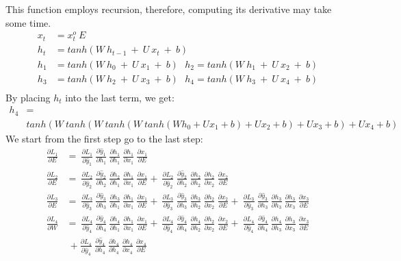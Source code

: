 \documentclass{article}
\begin{document}
This function employs recursion, therefore, computing its derivative may take some time.
\begin{align*}
        x_t &= x^o_t ~ E\\
	h_t &= tanh(W ~h_{t-1}~+~U~x_t ~+~b)\\
	h_1 & = tanh(W ~h_{0}~+~U~x_1 ~+~b) ~~~ h_2 = tanh(W ~h_{1}~+~U~x_2 ~+~b)\\
	h_3 &= tanh(W ~h_{2}~+~U~x_3 ~+~b)~~~h_4 = tanh(W ~h_{3}~+~U~x_4 ~+~b)\\
\end{align*}
By placing $h_t$ into the last term, we get:
\begin{align*}
	h_4 &= \\
	& tanh(W ~tanh(W ~tanh(W ~tanh(W h_{0}+Ux_1 +b)+Ux_2 +b)+Ux_3 +b) +Ux_4 +b)
\end{align*}
We start from the first step go to the last step:
\begin{align*}
\frac{\partial L_1}{ \partial{E}} & = ~\frac{\partial L_1}{ \partial \hat{y}_1}~\frac{\partial \hat{y}_1}{ \partial h_1}
 ~\frac{\partial h_1}{ \partial h_1} ~\frac{\partial h_1}{ \partial x_1} ~\frac{\partial x_1}{ \partial E}\\
	\frac{\partial L_2}{ \partial{E}} & = ~\frac{\partial L_2}{ \partial \hat{y}_2}~\frac{\partial \hat{y}_2}{ \partial h_2}
 ~\frac{\partial h_2}{ \partial h_1} ~\frac{\partial h_1}{ \partial x_1} ~\frac{\partial x_1}{ \partial E}	+ ~\frac{\partial L_2}{ \partial \hat{y}_2}~\frac{\partial \hat{y}_2}{ \partial h_2}
 ~\frac{\partial h_2}{ \partial h_2} ~\frac{\partial h_2}{ \partial x_2} ~\frac{\partial x_2}{ \partial E} \\
 \frac{\partial L_3}{ \partial{E}} & = ~\frac{\partial L_3}{ \partial \hat{y}_3}~\frac{\partial \hat{y}_3}{ \partial h_3}
 ~\frac{\partial h_3}{ \partial h_1} ~\frac{\partial h_1}{ \partial x_1} ~\frac{\partial x_1}{ \partial E}	+ ~\frac{\partial L_3}{ \partial \hat{y}_3}~\frac{\partial \hat{y}_3}{ \partial h_3}
 ~\frac{\partial h_3}{ \partial h_2} ~\frac{\partial h_2}{ \partial x_2} ~\frac{\partial x_2}{ \partial E} +  ~\frac{\partial L_3}{ \partial \hat{y}_3}~\frac{\partial \hat{y}_3}{ \partial h_3}
 ~\frac{\partial h_3}{ \partial h_3} ~\frac{\partial h_3}{ \partial x_3} ~\frac{\partial x_3}{ \partial E} \\
 \frac{\partial L_4}{ \partial{W}} & = ~\frac{\partial L_4}{ \partial \hat{y}_4}~\frac{\partial \hat{y}_4}{ \partial h_4}
 ~\frac{\partial h_4}{ \partial h_1} ~\frac{\partial h_1}{ \partial x_1} ~\frac{\partial x_1}{ \partial E}	+ ~\frac{\partial L_4}{ \partial \hat{y}_4}~\frac{\partial \hat{y}_4}{ \partial h_4}
 ~\frac{\partial h_4}{ \partial h_2} ~\frac{\partial h_2}{ \partial x_2} ~\frac{\partial x_2}{ \partial E} +  ~\frac{\partial L_4}{ \partial \hat{y}_4}~\frac{\partial \hat{y}_4}{ \partial h_4}
 ~\frac{\partial h_4}{ \partial h_3} ~\frac{\partial h_3}{ \partial x_3} ~\frac{\partial x_3}{ \partial E} \\ &~+ \frac{\partial L_4}{ \partial \hat{y}_4}~\frac{\partial \hat{y}_4}{ \partial h_4}
 ~\frac{\partial h_4}{ \partial h_4} ~\frac{\partial h_4}{ \partial x_4} ~\frac{\partial x_4}{ \partial E}
\end{align*}
\end{document}
